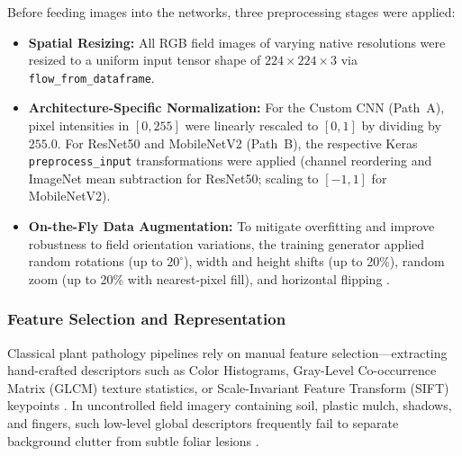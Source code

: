 Before feeding images into the networks, three preprocessing stages were applied:
\begin{itemize}
    \item \textbf{Spatial Resizing:} All RGB field images of varying native resolutions were resized to a uniform input tensor shape of $224 \times 224 \times 3$ via \texttt{flow\_from\_dataframe}.
    \item \textbf{Architecture-Specific Normalization:} For the Custom CNN (Path~A), pixel intensities in $[0, 255]$ were linearly rescaled to $[0, 1]$ by dividing by $255.0$. For ResNet50 and MobileNetV2 (Path~B), the respective Keras \texttt{preprocess\_input} transformations were applied (channel reordering and ImageNet mean subtraction for ResNet50; scaling to $[-1, 1]$ for MobileNetV2).
    \item \textbf{On-the-Fly Data Augmentation:} To mitigate overfitting and improve robustness to field orientation variations, the training generator applied random rotations (up to $20^\circ$), width and height shifts (up to 20\%), random zoom (up to 20\% with nearest-pixel fill), and horizontal flipping \cite{shorten2019survey}.
\end{itemize}

\subsubsection{Feature Selection and Representation}
Classical plant pathology pipelines rely on manual feature selection---extracting hand-crafted descriptors such as Color Histograms, Gray-Level Co-occurrence Matrix (GLCM) texture statistics, or Scale-Invariant Feature Transform (SIFT) keypoints \cite{alhiary2011fast, arivazhagan2013detection, pujari2016image}. In uncontrolled field imagery containing soil, plastic mulch, shadows, and fingers, such low-level global descriptors frequently fail to separate background clutter from subtle foliar lesions \cite{ngugi2021recent}.

